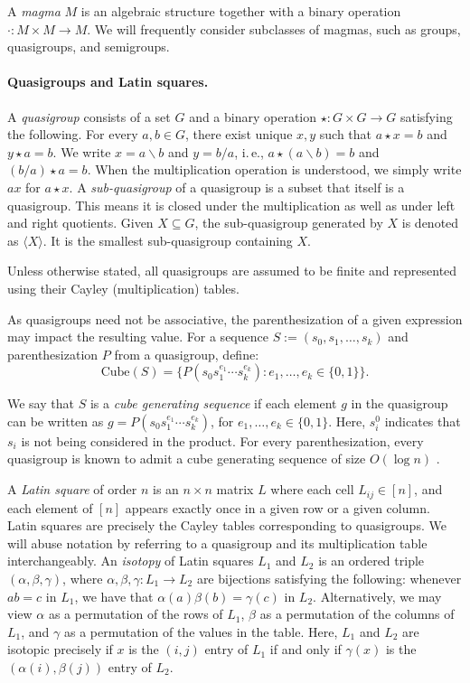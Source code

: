 \documentclass{article}
\begin{document}
\noindent A \textit{magma} $M$ is an algebraic structure together with a binary operation $\cdot : M \times M \to M$. We will frequently consider subclasses of magmas, such as groups, quasigroups, and semigroups. 

\paragraph{Quasigroups and Latin squares.} A \textit{quasigroup} consists of a set $G$ and a binary operation $\star : G \times G \to G$ satisfying the following. For every $a, b \in G$, there exist unique $x, y$ such that $a \star x = b$ and $y \star a = b$.  We write $x = a\backslash b$ and $y = b/a$, i.\,e., $a\star (a\backslash b) = b$ and $ (b/a) \star a = b$. When the multiplication operation is understood, we simply write $ax$ for $a \star x$. A \emph{sub-quasigroup} of a quasigroup is a subset that itself is a quasigroup. This means it is closed under the multiplication as well as under left and right quotients. Given $X \subseteq G$, the sub-quasigroup generated by $X$ is denoted as $ \langle X \rangle$. It is the smallest sub-quasigroup containing $X$.

Unless otherwise stated, all quasigroups are assumed to be finite and represented using their Cayley (multiplication) tables. 




As quasigroups need not be associative, the parenthesization of a given expression may impact the resulting value.  For a sequence $S := (s_{0}, s_{1}, \ldots, s_{k})$ and parenthesization $P$ from a quasigroup, define:
\[
\text{Cube}(S) = \{ P(s_{0}s_{1}^{e_{1}} \cdots s_{k}^{e_{k}}) : e_{1}, \ldots, e_{k} \in \{0,1\} \}.
\]

We say that $S$ is a \textit{cube generating sequence} if each element $g$ in the quasigroup can be written as $g = P(s_{0}s_{1}^{e_{1}} \cdots s_{k}^{e_{k}})$, for $e_{1}, \ldots, e_{k} \in \{0,1\}$. Here, $s_{i}^{0}$ indicates that $s_{i}$ is not being considered in the product.  For every parenthesization, every quasigroup is known to admit a cube generating sequence of size $O(\log n)$ \cite{ChattopadhyayToranWagner}.


A \textit{Latin square} of order $n$ is an $n \times n$ matrix $L$ where each cell $L_{ij} \in [n]$, and each element of $[n]$ appears exactly once in a given row or a given column. Latin squares are precisely the Cayley tables corresponding to quasigroups. We will abuse notation by referring to a quasigroup and its multiplication table interchangeably. An \textit{isotopy} of Latin squares $L_{1}$ and $L_{2}$ is an ordered triple $(\alpha, \beta, \gamma)$, where $\alpha, \beta, \gamma : L_{1} \to L_{2}$ are bijections satisfying the following: whenever $ab = c$ in $L_{1}$, we have that $\alpha(a)\beta(b) = \gamma(c)$ in $L_{2}$. Alternatively, we may view $\alpha$ as a permutation of the rows of $L_{1}$, $\beta$ as a permutation of the columns of $L_{1}$, and $\gamma$ as a permutation of the values in the table. Here, $L_{1}$ and $L_{2}$ are isotopic precisely if $x$ is the $(i,j)$ entry of $L_{1}$ if and only if $\gamma(x)$ is the $(\alpha(i), \beta(j))$ entry of $L_{2}$.
\end{document}
